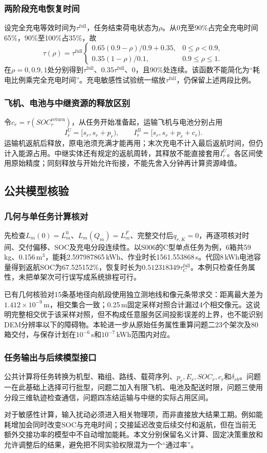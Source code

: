 \subsubsection{两阶段充电恢复时间}
设完全充电等效时间为$\tau^{\mathrm{full}}$，任务结束荷电状态为$\rho$。从0充至90\%占完全充电时间65\%，90\%至100\%占35\%，故
\begin{equation}
 \tau(\rho)=\tau^{\mathrm{full}}\begin{cases}
 0.65(0.9-\rho)/0.9+0.35,&0\le\rho<0.9,\\
 0.35(1-\rho)/0.1,&0.9\le\rho\le1.
 \end{cases}
\label{eq:common_recharge}
\end{equation}
在$\rho=0,0.9,1$处分别得到$\tau^{\mathrm{full}}$、$0.35\tau^{\mathrm{full}}$、0，且90\%处连续。该函数不能简化为“耗电比例乘完全充电时间”。充电敏感性试验统一缩放$\tau^{\mathrm{full}}$，仍保留上述两段比例。

\subsubsection{飞机、电池与中继资源的释放区别}
令$c_r=\tau(SOC_r^{\mathrm{return}})$，从任务开始准备起，运输飞机与电池分别占用
\begin{equation}
 I_r^U=[s_r,s_r+p_r),\qquad I_r^B=[s_r,s_r+p_r+c_r).
\label{eq:common_occupancy}
\end{equation}
运输机返航后释放，原电池须充满才能再用；末次充电不计入最后返航时间，但仍计入能源占用。中继实体还有规定的返航周转，其释放不能直接套用$I_r^U$。各区间使用原始精度；同刻释放与开始允许衔接，不能先舍入分钟再计算资源峰值。



\subsection{公共模型核验}
\subsubsection{几何与单任务计算核对}
先检查$L_m(0)=L_m^0$、$L_m(Q_m)=L_m^F$、完整交付后$q_{r,K}=0$，再逐项核对时间、交付偏移、SOC及充电分段连续性。以S006的C型单点任务为例，6箱共59\,kg、0.156\,m$^3$，能耗2.597987865\,kWh、作业时长1561.553868\,s。代回8\,kWh电池容量得到返航SOC为67.525152\%，恢复时长为$0.512318349\tau_C^{\mathrm{full}}$。本例只检查任务属性，未把单架次可行误写成系统排程可行。

已有几何核验对15条基地径向航段使用独立测地线和像元条带求交：距离最大差为$1.412\times10^{-9}$\,m，相交集合一致；0.25\,m固定采样对照合计漏过4个相交像元。这说明完整相交优于该采样对照，但不构成任意服务区间投影误差的上界，也不能识别DEM分辨率以下的障碍物。本轮进一步从原始任务属性重算问题二23个架次及80箱交付，与保存计划在$10^{-6}$\,s和$10^{-7}$\,kWh范围内对应。

\subsubsection{任务输出与后续模型接口}
公共计算将任务转换为机型、箱组、路线、载荷序列、$p_r,E_r,SOC_r,c_r$和$\delta_{rb}$。问题一在此基础上选择可行批型，问题二加入有限飞机、电池及配送时限，问题三使用分段三维轨迹检查通信，问题四冻结运输与中继的实际占用区间。

对于敏感性计算，输入扰动必须进入相关物理项，而非直接放大结果工期。例如能耗增加会同时改变SOC与充电时间；交接延迟改变后续交付和返航，但在当前无额外交接功率的模型中不自动增加能耗。本文分别保留名义计算、固定决策重放和允许调整后的结果，避免把不同实验权限混为一个“通过率”。
